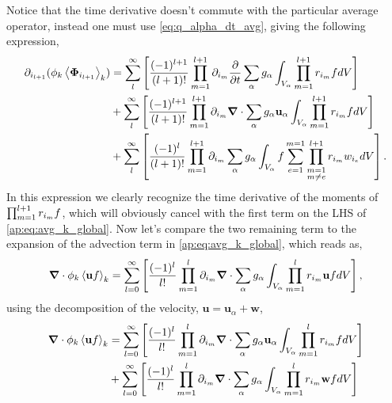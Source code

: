 Notice that the time derivative doesn't commute with the particular average operator, instead one must use \ref{eq:q_alpha_dt_avg}, giving the following expression, 
\begin{align}
    \partial_{i_{l+1}}
    (\phi_k \left<\bm{\Phi}_{i_{l+1}}\right>_k)
    & =\sum_l^\infty
    \left[
        \frac{(-1)^{l+1}}{(l+1)!}
        \prod^{l+1}_{m=1}
        \partial_{i_m}
        \frac{\partial}{\partial t}
        \sum_{\alpha}
        g_{\alpha} \int_{V_\alpha}
        \prod_{m=1}^{l+1} r_{i_m}  f dV
    \right]
    \\
    & + \sum_l^\infty
    \left[
        \frac{(-1)^{l+1}}{(l+1)!}
        \prod^{l+1}_{m=1}
        \partial_{i_m}
        \bm{\nabla} \cdot
        \sum_{\alpha}
        g_{\alpha} \textbf{u}_\alpha 
        \int_{V_\alpha}
        \prod_{m=1}^{l+1} r_{i_m}  f  dV
        \right]\\
        &+\sum_l^\infty
    \left[
        \frac{(-1)^{l}}{(l+1)!}
        \prod^{l+1}_{m=1}
        \partial_{i_m}
        \sum_{\alpha}
        g_{\alpha}\int_{V_\alpha}
        f\sum_{e=1}^{m=1} 
        \prod^{l+1}_{\substack{m=1\\ m\neq e}} 
        r_{i_m} 
        w_{i_e}
        dV
    \right].
    \label{ap:eq:partial_Phi}
\end{align}
In this expression we clearly recognize the time derivative of the moments of $\prod_{m=1}^{l+1} r_{i_m}f$, which will obviously cancel with the first term on the LHS of \ref{ap:eq:avg_k_global}.
Now let's compare the two remaining term to the expansion of the advection term in \ref{ap:eq:avg_k_global}, which reads as, 
\begin{equation}
    \bm{\nabla} \cdot \phi_k \left<\textbf{u} f\right>_k
    = \sum_{l=0}^\infty  
    \left[
        \frac{(-1)^l}{l!} \prod^{l}_{m=1}\partial_{i_m}
        \bm{\nabla} \cdot
        \sum_\alpha  g_\alpha \int_{V_\alpha} \prod^l_{m=1}r_{i_m} \textbf{u} f dV
    \right],
\end{equation}
using the decomposition of the velocity, $\textbf{u} = \textbf{u}_\alpha + \textbf{w}$, 
\begin{align}
    \bm{\nabla} \cdot \phi_k \left<\textbf{u} f\right>_k
    &= \sum_{l=0}^\infty  
    \left[
        \frac{(-1)^l}{l!} \prod^{l}_{m=1}\partial_{i_m}
        \bm{\nabla} \cdot
        \sum_\alpha  g_\alpha \textbf{u}_\alpha  \int_{V_\alpha} \prod^l_{m=1}r_{i_m} f dV
    \right]\\
    &+ \sum_{l=0}^\infty  
    \left[
        \frac{(-1)^l}{l!} \prod^{l}_{m=1}\partial_{i_m}
        \bm{\nabla} \cdot
        \sum_\alpha  g_\alpha \int_{V_\alpha} \prod^l_{m=1}r_{i_m} \textbf{w} f dV
    \right]
    \label{ap:eq:partial_uf}
\end{align}
